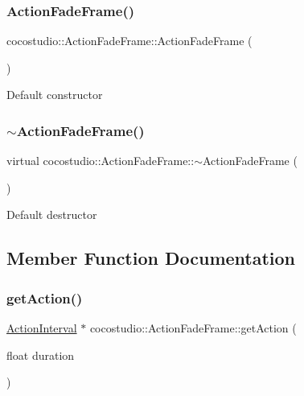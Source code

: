 \subsubsection{\texorpdfstring{Action\+Fade\+Frame()}{ActionFadeFrame()}\hspace{0.1cm}{\footnotesize\ttfamily [2/2]}}
{\footnotesize\ttfamily cocostudio\+::\+Action\+Fade\+Frame\+::\+Action\+Fade\+Frame (\begin{DoxyParamCaption}{ }\end{DoxyParamCaption})}

Default constructor \mbox{\label{classcocostudio_1_1ActionFadeFrame_ac1da06ec727168c4db008cf6ddaa2424}} 
\subsubsection{\texorpdfstring{$\sim$\+Action\+Fade\+Frame()}{~ActionFadeFrame()}\hspace{0.1cm}{\footnotesize\ttfamily [2/2]}}
{\footnotesize\ttfamily virtual cocostudio\+::\+Action\+Fade\+Frame\+::$\sim$\+Action\+Fade\+Frame (\begin{DoxyParamCaption}{ }\end{DoxyParamCaption})\hspace{0.3cm}{\ttfamily [virtual]}}

Default destructor 

\subsection{Member Function Documentation}
\mbox{\label{classcocostudio_1_1ActionFadeFrame_a666690711af56eb3dbe6e39c43655f08}} 
\subsubsection{\texorpdfstring{get\+Action()}{getAction()}\hspace{0.1cm}{\footnotesize\ttfamily [1/2]}}
{\footnotesize\ttfamily \hyperlink{classActionInterval}{Action\+Interval} $\ast$ cocostudio\+::\+Action\+Fade\+Frame\+::get\+Action (\begin{DoxyParamCaption}\item[{float}]{duration }\end{DoxyParamCaption})\hspace{0.3cm}{\ttfamily [virtual]}}

